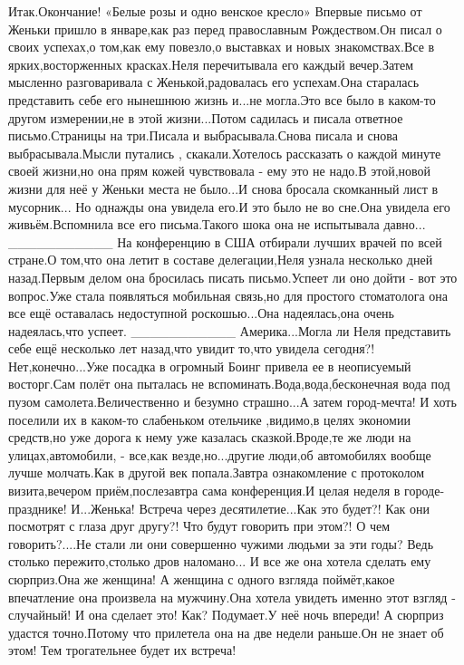 Итак.Окончание! 
«Белые розы и одно венское кресло»
Впервые письмо от Женьки пришло в январе,как раз перед православным Рождеством.Он писал о своих успехах,о том,как ему повезло,о выставках и новых знакомствах.Все в ярких,восторженных красках.Неля перечитывала его каждый вечер.Затем мысленно разговаривала с Женькой,радовалась его успехам.Она старалась представить себе его нынешнюю жизнь и...не могла.Это все было в каком-то другом измерении,не в этой жизни...Потом садилась и писала ответное письмо.Страницы на три.Писала и выбрасывала.Снова писала и снова выбрасывала.Мысли путались , скакали.Хотелось рассказать о каждой минуте своей жизни,но она прям кожей чувствовала - ему это не надо.В этой,новой жизни для неё у Женьки места не было...И снова бросала скомканный лист в мусорник...
Но однажды она увидела его.И это было не во сне.Она увидела его живьём.Вспомнила все его письма.Такого шока она не испытывала давно...
___________
На конференцию в США отбирали лучших врачей по всей стране.О том,что она летит в составе делегации,Неля узнала несколько дней назад.Первым делом она бросилась писать письмо.Успеет ли оно дойти - вот это вопрос.Уже стала появляться мобильная связь,но для простого стоматолога она все ещё оставалась недоступной роскошью...Она надеялась,она очень надеялась,что успеет.
___________
Америка...Могла ли Неля представить себе ещё несколько лет назад,что увидит то,что увидела сегодня?! Нет,конечно...Уже посадка в огромный Боинг привела ее в неописуемый восторг.Сам полёт она пыталась не вспоминать.Вода,вода,бесконечная вода под пузом самолета.Величественно и безумно страшно...А затем город-мечта! И хоть поселили их в каком-то слабеньком отельчике ,видимо,в целях экономии средств,но уже дорога к нему уже казалась сказкой.Вроде,те же люди на улицах,автомобили,
 - все,как везде,но...другие люди,об автомобилях вообще лучше молчать.Как в другой век попала.Завтра ознакомление с протоколом визита,вечером приём,послезавтра сама конференция.И целая неделя в городе-празднике! И...Женька! Встреча через десятилетие...Как это будет?! Как они посмотрят с глаза друг другу?! Что будут говорить при этом?! О чем говорить?....Не стали ли они совершенно чужими людьми за эти годы? Ведь столько пережито,столько дров наломано...
И все же она хотела сделать ему сюрприз.Она же женщина! А женщина с одного взгляда поймёт,какое впечатление она произвела на мужчину.Она хотела увидеть именно этот взгляд - случайный! И она сделает это! Как? Подумает.У неё ночь впереди! А сюрприз удастся точно.Потому что прилетела она на две недели раньше.Он не знает об этом! Тем трогательнее будет их встреча! 
